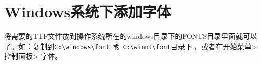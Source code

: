 \section{Windows系统下添加字体}
将需要的TTF文件放到操作系统所在的windows目录下的FONTS目录里面就可以了。如：复制到\verb+C:\windows\font 或 C:\winnt\font+目录下.，或者在开始菜单> 控制面板> 字体。
